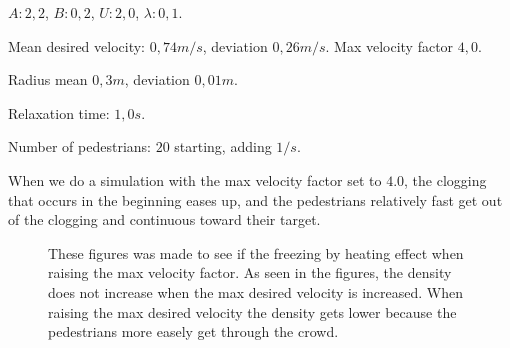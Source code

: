 \begin{itemize*}
    \item $A: 2,2$, $B: 0,2$, $U: 2,0$, $\lambda: 0,1$.
    \item Mean desired velocity: $0,74 m/s$, deviation $0,26 m/s$. Max 
        velocity factor $4,0$.
    \item Radius mean $0,3 m$, deviation $0,01 m$.
    \item Relaxation time: $1,0 s$.
    \item Number of pedestrians: $20$ starting, adding $1/s$.
\end{itemize*}

When we do a simulation with the max velocity factor set to $4.0$, the clogging
that occurs in the beginning eases up, and the pedestrians relatively fast
get out of the clogging and continuous toward their target.

\begin{figure}
\centering
{}
\caption{These figures was made to see if the freezing by heating effect when raising the max velocity factor. As seen in the figures, the
density does not increase when the max desired velocity is increased. When raising the max desired velocity the density gets lower because
the pedestrians more easely get through the crowd.}
\label{fig:freezingbyheating}
\end{figure}

